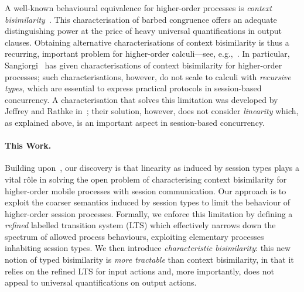 A well-known behavioural equivalence for higher-order processes
is \emph{context bisimilarity}~\cite{San96H}. This 
 characterisation of %
barbed congruence 
offers an adequate distinguishing power at the price of heavy universal quantifications in output clauses.
Obtaining alternative 
characterisations of context bisimilarity
is thus a recurring, important problem 
for higher-order calculi---see, e.g.,~\cite{SangiorgiD:expmpa,San96H,JeffreyR05,DBLP:journals/cl/KoutavasH12,DBLP:journals/corr/Xu13a,lenglet_et_al:LIPIcs:2015:5364}. 
In particular, Sangiorgi~\cite{SangiorgiD:expmpa,San96H} has 
given %
characterisations of context bisimilarity
for higher-order processes; such 
characterisations, however,  %
do not scale to  
  calculi with \emph{recursive types}, which %
  are essential to %
  express practical protocols in 
session-based concurrency. A characterisation  
that solves this limitation was developed by Jeffrey and Rathke in~\cite{JeffreyR05};
their solution, however, does not consider \emph{linearity} which, as explained above, is an important aspect in session-based concurrency.


\paragraph{This Work.}
Building upon~\cite{SangiorgiD:expmpa,San96H,JeffreyR05}, 
our discovery is that {linearity} as induced by session types plays a vital r\^{o}le 
% 
in 
solving 
the %
open problem 
of characterising context bisimilarity for higher-order mobile processes with session communication.
Our approach is to exploit 
the coarser semantics induced by session types to limit
the behaviour of higher-order session processes. 
 Formally, we enforce this limitation by defining
a \emph{refined} labelled transition system (LTS)
which effectively 
narrows down the spectrum of allowed process behaviours, 
exploiting elementary processes inhabiting session types.
We then introduce \emph{characteristic bisimilarity}: this  
 new notion of typed bisimilarity   is 
\emph{more tractable} than context bisimilarity, in that 
it relies on the refined LTS for input actions and, more importantly, 
does not appeal to universal quantifications on output actions. 

